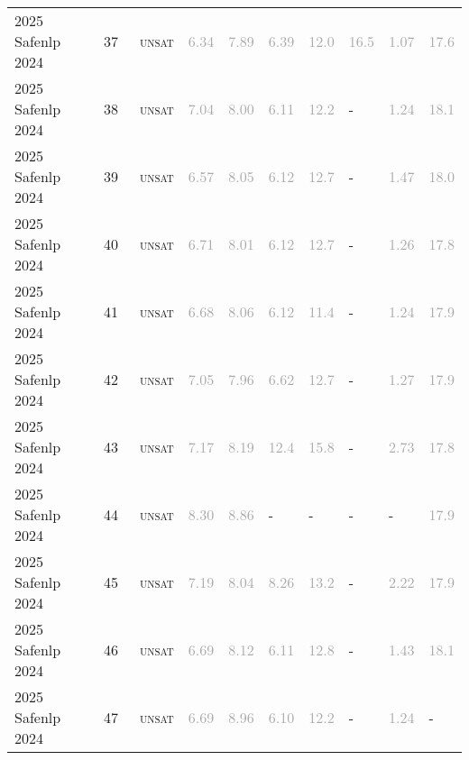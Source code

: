\begin{center}
{\begin{longtable}{@{}llllllllll@{}}
2025 Safenlp 2024 & 37 & ~\textsc{unsat} & \textcolor{darkgray}{6.34} & \textcolor{darkgray}{7.89} & \textcolor{darkgray}{6.39} & \textcolor{darkgray}{12.0} & \textcolor{darkgray}{16.5} & \textcolor{darkgray}{1.07} & \textcolor{darkgray}{17.6} \\
2025 Safenlp 2024 & 38 & ~\textsc{unsat} & \textcolor{darkgray}{7.04} & \textcolor{darkgray}{8.00} & \textcolor{darkgray}{6.11} & \textcolor{darkgray}{12.2} & - & \textcolor{darkgray}{1.24} & \textcolor{darkgray}{18.1} \\
2025 Safenlp 2024 & 39 & ~\textsc{unsat} & \textcolor{darkgray}{6.57} & \textcolor{darkgray}{8.05} & \textcolor{darkgray}{6.12} & \textcolor{darkgray}{12.7} & - & \textcolor{darkgray}{1.47} & \textcolor{darkgray}{18.0} \\
2025 Safenlp 2024 & 40 & ~\textsc{unsat} & \textcolor{darkgray}{6.71} & \textcolor{darkgray}{8.01} & \textcolor{darkgray}{6.12} & \textcolor{darkgray}{12.7} & - & \textcolor{darkgray}{1.26} & \textcolor{darkgray}{17.8} \\
2025 Safenlp 2024 & 41 & ~\textsc{unsat} & \textcolor{darkgray}{6.68} & \textcolor{darkgray}{8.06} & \textcolor{darkgray}{6.12} & \textcolor{darkgray}{11.4} & - & \textcolor{darkgray}{1.24} & \textcolor{darkgray}{17.9} \\
2025 Safenlp 2024 & 42 & ~\textsc{unsat} & \textcolor{darkgray}{7.05} & \textcolor{darkgray}{7.96} & \textcolor{darkgray}{6.62} & \textcolor{darkgray}{12.7} & - & \textcolor{darkgray}{1.27} & \textcolor{darkgray}{17.9} \\
2025 Safenlp 2024 & 43 & ~\textsc{unsat} & \textcolor{darkgray}{7.17} & \textcolor{darkgray}{8.19} & \textcolor{darkgray}{12.4} & \textcolor{darkgray}{15.8} & - & \textcolor{darkgray}{2.73} & \textcolor{darkgray}{17.8} \\
2025 Safenlp 2024 & 44 & ~\textsc{unsat} & \textcolor{darkgray}{8.30} & \textcolor{darkgray}{8.86} & - & - & - & - & \textcolor{darkgray}{17.9} \\
2025 Safenlp 2024 & 45 & ~\textsc{unsat} & \textcolor{darkgray}{7.19} & \textcolor{darkgray}{8.04} & \textcolor{darkgray}{8.26} & \textcolor{darkgray}{13.2} & - & \textcolor{darkgray}{2.22} & \textcolor{darkgray}{17.9} \\
2025 Safenlp 2024 & 46 & ~\textsc{unsat} & \textcolor{darkgray}{6.69} & \textcolor{darkgray}{8.12} & \textcolor{darkgray}{6.11} & \textcolor{darkgray}{12.8} & - & \textcolor{darkgray}{1.43} & \textcolor{darkgray}{18.1} \\
2025 Safenlp 2024 & 47 & ~\textsc{unsat} & \textcolor{darkgray}{6.69} & \textcolor{darkgray}{8.96} & \textcolor{darkgray}{6.10} & \textcolor{darkgray}{12.2} & - & \textcolor{darkgray}{1.24} & - \\

\end{longtable}}
\end{center}

